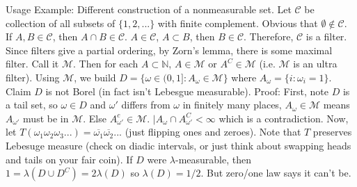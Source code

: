 \documentclass[12pt]{article}
\begin{document}
Usage Example: Different construction of a nonmeasurable set.  Let $\mathcal{C}$ be collection of all subsets of $\{1, 2, ... \}$ with finite complement.  Obvious that $\emptyset \not\in \mathcal{C}$.  If $A, B \in \mathcal{C}$, then $A \cap B \in \mathcal{C}$.  $A \in \mathcal{C}$, $A \subset B$, then $B \in \mathcal{C}$.  Therefore, $\mathcal{C}$ is a filter.  Since filters give a partial ordering, by Zorn's lemma, there is some maximal filter.  Call it $\mathcal{M}$.  Then for each $A \subset \mathbb{N}$, $A \in \mathcal{M}$ or $A^C \in \mathcal{M}$ (i.e. $\mathcal{M}$ is an ultra filter).  Using $\mathcal{M}$, we build $D = \{ \omega \in (0, 1] : A_\omega \in \mathcal{M} \}$ where $A_{\omega} = \{ i : \omega_i = 1\}$.  Claim $D$ is not Borel (in fact isn't Lebesgue measurable).  Proof: First, note $D$ is a tail set, so $\omega \in D$ and $\omega'$ differs from $\omega$ in finitely many places, $A_\omega \in \mathcal{M}$ means $A_{\omega'}$ must be in $\mathcal{M}$.  Else $A^c_{\omega'} \in \mathcal{M}$.  $|A_\omega \cap A_{\omega'}^C < \infty$ which is a contradiction.  Now, let $T(\omega_1 \omega_2 \omega_3 ...) = \overline{\omega_1} \overline{\omega_2} ...$ (just flipping ones and zeroes).  Note that $T$ preserves Lebesuge measure (check on diadic intervals, or just think about swapping heads and tails on your fair coin).  If $D$ were $\lambda$-measurable, then $1 = \lambda(D \cup D^C) = 2 \lambda(D)$ so $\lambda(D) = 1/2$.  But zero/one law says it can't be.
\end{document}
